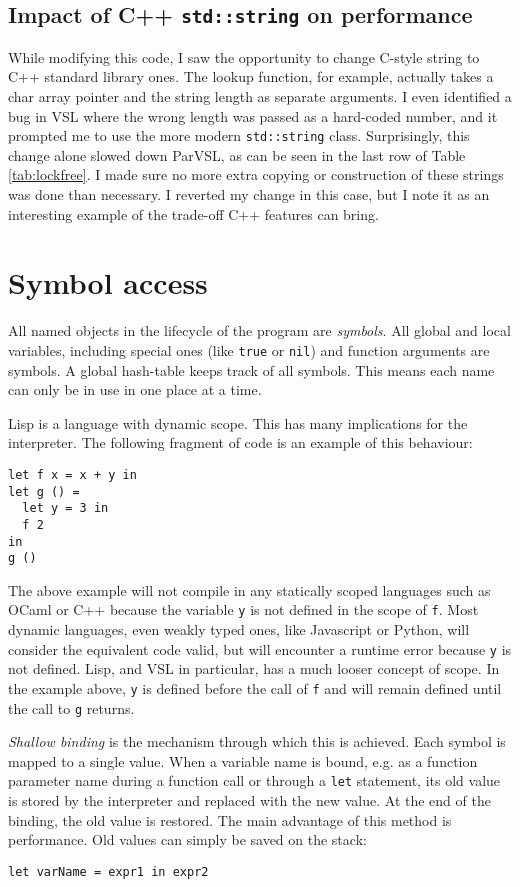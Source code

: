 \subsection{Impact of C++ \texttt{std::string} on performance}

While modifying this code, I saw the opportunity to change C-style string to C++
standard library ones. The lookup function, for example, actually takes a char array
pointer and the string length as separate arguments. I even identified a bug
in VSL where the wrong length was passed as a hard-coded number, and it prompted
me to use the more modern \verb|std::string| class. Surprisingly, this change alone
slowed down ParVSL, as can be seen in the last row of Table \ref{tab:lockfree}.
I made sure no more extra copying or construction of these strings was done than
necessary. I reverted my change in this case, but I note it as an interesting example
of the trade-off C++ features can bring.

\section{Symbol access}
\label{sec:symbols}

All named objects in the lifecycle of the program are \emph{symbols}. All global and local variables, including
special ones (like \texttt{true} or \texttt{nil}) and function arguments are symbols. A global hash-table keeps track of
all symbols. This means each name can only be in use in one place at a time.

Lisp is a language with dynamic scope. This has many implications for the interpreter. The following
fragment of code is an example of this behaviour:
\begin{verbatim}
let f x = x + y in
let g () =
  let y = 3 in
  f 2
in
g ()
\end{verbatim}

The above example will not compile in any statically scoped languages such as OCaml or C++
because the variable \verb|y| is not defined in the scope of \verb|f|.
Most dynamic languages, even weakly typed ones, like Javascript or Python, will consider the equivalent
code valid, but will encounter a runtime error because \verb|y| is not defined.
Lisp, and VSL in particular, has a much looser concept of scope.
In the example above, \verb|y| is defined before the call of \verb|f| and will remain defined until the
call to \verb|g| returns.

\emph{Shallow binding} is the mechanism through which this is achieved. Each symbol is mapped to a single value.
When a variable name is bound, e.g. as a function parameter name during a function call or through a
\texttt{let} statement, its old value is stored by the interpreter and replaced with the new value. At the end of the binding,
the old value is restored. The main advantage of this method is performance. Old values can simply be saved
on the stack:
\begin{verbatim}
let varName = expr1 in expr2
\end{verbatim}

